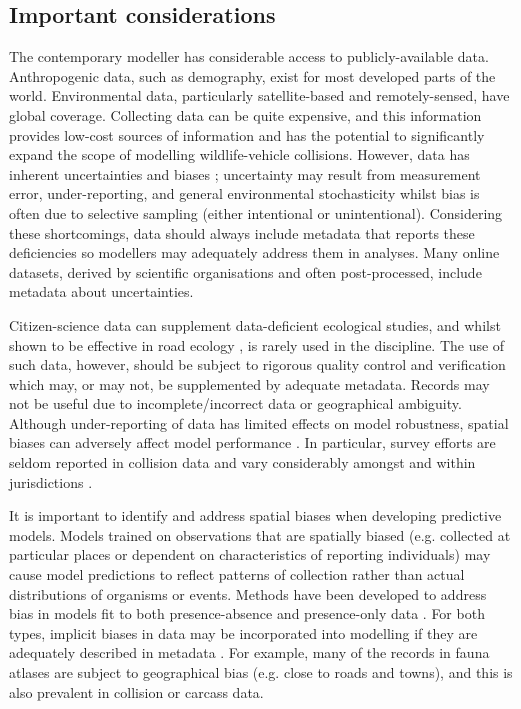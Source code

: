 \subsection{Important considerations}

The contemporary modeller has considerable access to publicly-available data. Anthropogenic data, such as demography, exist for most developed parts of the world. Environmental data, particularly satellite-based and remotely-sensed, have global coverage. Collecting data can be quite expensive, and this information provides low-cost sources of information and has the potential to significantly expand the scope of modelling wildlife-vehicle collisions. However, data has inherent uncertainties and biases \citep{glym97}; uncertainty may result from measurement error, under-reporting, and general environmental stochasticity whilst bias is often due to selective sampling (either intentional or unintentional). Considering these shortcomings, data should always include metadata that reports these deficiencies so modellers may adequately address them in analyses. Many online datasets, derived by scientific organisations and often post-processed, include metadata about uncertainties.

Citizen-science data can supplement data-deficient ecological studies, and whilst shown to be effective in road ecology \citep{paul14}, is rarely used in the discipline. The use of such data, however, should be subject to rigorous quality control and verification which may, or may not, be supplemented by adequate metadata. Records may not be useful due to incomplete/incorrect data or geographical ambiguity. Although under-reporting of data has limited effects on model robustness, spatial biases can adversely affect model performance \citep{snow15}. In particular, survey efforts are seldom reported in collision data and vary considerably amongst and within jurisdictions \citep{huij07a}.

It is important to identify and address spatial biases when developing predictive models. Models trained on observations that are spatially biased (e.g. collected at particular places or dependent on characteristics of reporting individuals) may cause model predictions to reflect patterns of collection rather than actual distributions of organisms or events. Methods have been developed to address bias in models fit to both presence-absence \citep{hijm12} and presence-only data \citep{kram13}. For both types, implicit biases in data may be incorporated into modelling if they are adequately described in metadata \citep{wart13}. For example, many of the records in fauna atlases are subject to geographical bias (e.g. close to roads and towns), and this is also prevalent in collision or carcass data.

